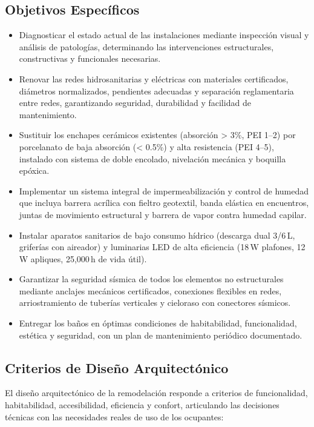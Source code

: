 ﻿\documentclass[12pt]{article}
\begin{document}
\subsection{Objetivos Específicos}

\begin{itemize}[noitemsep]
  \item Diagnosticar el estado actual de las instalaciones mediante inspección visual
  y análisis de patologías, determinando las intervenciones estructurales, constructivas
  y funcionales necesarias.
  \item Renovar las redes hidrosanitarias y eléctricas con materiales certificados,
  diámetros normalizados, pendientes adecuadas y separación reglamentaria entre redes,
  garantizando seguridad, durabilidad y facilidad de mantenimiento.
  \item Sustituir los enchapes cerámicos existentes (absorción > 3\%, PEI 1--2) por
  porcelanato de baja absorción (< 0.5\%) y alta resistencia (PEI 4--5), instalado
  con sistema de doble encolado, nivelación mecánica y boquilla epóxica.
  \item Implementar un sistema integral de impermeabilización y control de humedad
  que incluya barrera acrílica con fieltro geotextil, banda elástica en encuentros,
  juntas de movimiento estructural y barrera de vapor contra humedad capilar.
  \item Instalar aparatos sanitarios de bajo consumo hídrico (descarga dual 3/6\,L,
  griferías con aireador) y luminarias LED de alta eficiencia (18\,W plafones,
  12\,W apliques, 25,000\,h de vida útil).
  \item Garantizar la seguridad sísmica de todos los elementos no estructurales
  mediante anclajes mecánicos certificados, conexiones flexibles en redes,
  arriostramiento de tuberías verticales y cieloraso con conectores sísmicos.
  \item Entregar los baños en óptimas condiciones de habitabilidad, funcionalidad,
  estética y seguridad, con un plan de mantenimiento periódico documentado.
\end{itemize}

\subsection{Criterios de Diseño Arquitectónico}

El diseño arquitectónico de la remodelación responde a criterios de funcionalidad,
habitabilidad, accesibilidad, eficiencia y confort, articulando las decisiones
técnicas con las necesidades reales de uso de los ocupantes:
\end{document}
